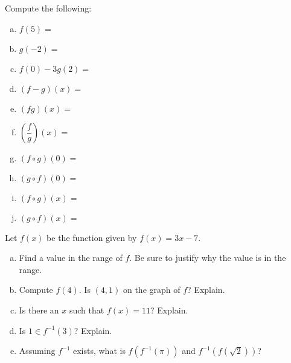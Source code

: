 \documentclass[11pt,letterpaper]{article}
\begin{document}
Compute the following: \pspace
        \begin{enumerate}[(a)]
        \item $f(5)=$ \vfill
        \item $g(-2)=$ \vfill
        \item $f(0) - 3g(2)=$ \vfill
        \item $(f - g)(x)=$ \vfill
        \item $(fg)(x)=$ \vfill
        \item $\left( \dfrac{f}{g} \right)(x)=$ \vfill
        \item $(f \circ g)(0)=$ \vfill
        \item $(g \circ f)(0)=$ \vfill
        \item $(f \circ g)(x)=$ \vfill
        \item $(g \circ f)(x)=$ \vfill
        \end{enumerate} 



\newpage



 Let $f(x)$ be the function given by $f(x)= 3x - 7$. 
	\begin{enumerate}[(a)]
	\item Find a value in the range of $f$. Be sure to justify why the value is in the range. 
	\item Compute $f(4)$. Is $(4, 1)$ on the graph of $f$? Explain. 
	\item Is there an $x$ such that $f(x)= 11$? Explain. 
	\item Is $1 \in f^{-1}(3)$? Explain. 
	\item Assuming $f^{-1}$ exists, what is $f(f^{-1}(\pi))$ and $f^{-1}(f(\sqrt{2}))$?
	\end{enumerate}
\end{document}
